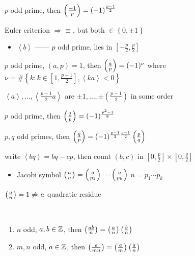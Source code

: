 \begin{cor}
    $p$ odd prime, then $\left( \frac{-1}{p} \right) = (-1)^{\frac{p-1}{2}}$
\end{cor}
\begin{pf}
    Euler criterion $\Rightarrow \equiv$, but both $\in \left\{ 0, \pm 1 \right\}$
\end{pf}

\begin{itemize}
    \item $\left< b \right>$ ------ $p$ odd prime, lies in $[-\frac{p}{2}, \frac{p}{2}]$
\end{itemize}

\begin{prop}
    $p$ odd prime, $(a, p) = 1$, then $\left( \frac{a}{p} \right) = (-1)^\nu$ where $\nu = \# \left\{ k : k \in [1, \frac{p-1}{2}], \left< ka \right> < 0 \right\}$
\end{prop}
\begin{pf}
    $\left< a \right>, \dots, \left< \frac{p-1}{2}a \right>$ are $\pm 1, \dots, \pm \left(\frac{p-1}{2}\right)$ in some order
\end{pf}

\begin{cor}
    $p$ odd prime, then $\left( \frac{2}{p} \right) = (-1)^{\frac{p^2 - 1}{8}}$
\end{cor}

\begin{thm}
    $p, q$ odd primes, then $\left( \frac{q}{p} \right) = (-1)^{\frac{p-1}{2}\frac{q-1}{2}}\left( \frac{p}{q} \right)$
\end{thm}
\begin{pf}
    write $\left< bq \right> = bq - cp$, then count $(b, c)$ in $[0, \frac{p}{2}] \times [0, \frac{q}{2}]$
\end{pf}

\begin{itemize}
    \item Jacobi symbol $\left( \frac{a}{n} \right) = \left( \frac{a}{p_1} \right) \cdots \left( \frac{a}{p_k} \right)$ \dash $n = p_1\cdots p_k$
\end{itemize}
\begin{fact}
    $\left( \frac{a}{n} \right) = 1 \not\Rightarrow a$ quadratic residue
\end{fact}

\begin{lemma}\,
    \begin{enumerate}
        \item $n$ odd, $a, b\in \mathbb{Z}$, then $\left( \frac{ab}{n} \right) = \left( \frac{a}{n} \right)\left( \frac{b}{n} \right)$
        \item $m, n$ odd, $a \in \mathbb{Z}$, then $\left( \frac{a}{mn} \right) = \left( \frac{a}{m} \right) \left( \frac{a}{n} \right)$
    \end{enumerate}
\end{lemma}

